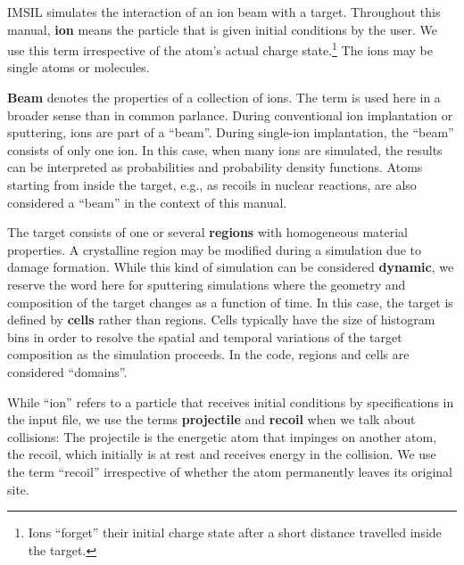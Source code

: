 IMSIL simulates the interaction of an ion beam with a target. Throughout this
manual, \textbf{ion} means the particle that is given initial conditions by the
user. We use this term irrespective of the atom's actual charge
state.\footnote{Ions ``forget'' their initial charge state after a short
distance travelled inside the target.} The ions may be single atoms or
molecules.

\textbf{Beam} denotes the properties of a collection of ions. The term is
used here in a broader sense than in common parlance. During conventional ion
implantation or sputtering, ions are part of a ``beam''. During single-ion
implantation, the ``beam'' consists of only one ion. In this case, when many
ions are simulated, the results can be interpreted as probabilities and
probability density functions. Atoms starting from inside the target, e.g., as
recoils in nuclear reactions, are also considered a ``beam'' in the context
of this manual.

The target consists of one or several \textbf{regions} with homogeneous material
properties. A crystalline region may be modified during a simulation due to
damage formation. While this kind of simulation can be considered
\textbf{dynamic}, we reserve the word here for sputtering simulations where the
geometry and composition of the target changes as a function of time. In this
case, the target is defined by \textbf{cells} rather than regions. Cells
typically have the size of histogram bins in order to resolve the spatial and
temporal variations of the target composition as the simulation proceeds. In the
code, regions and cells are considered ``domains''.

While ``ion'' refers to a particle that receives initial conditions by
specifications in the input file, we use the terms \textbf{projectile} and
\textbf{recoil} when we talk about collisions: The projectile is the energetic
atom that impinges on another atom, the recoil, which initially is at rest and
receives energy in the collision. We use the term ``recoil'' irrespective of
whether the atom permanently leaves its original site.

